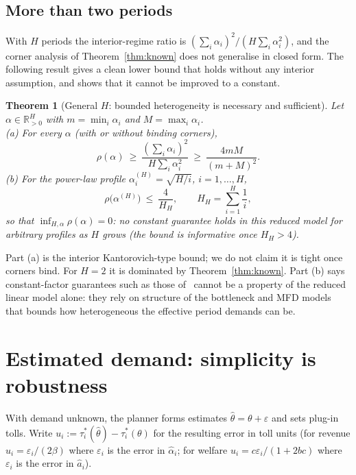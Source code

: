 \documentclass[11pt]{article}
\newtheorem{theorem}{Theorem}[section]
\theoremstyle{definition}
\theoremstyle{remark}
\newcommand{\R}{\mathbb{R}}
\begin{document}
\subsection{More than two periods}
With $H$ periods the interior-regime ratio is $(\sum_i\alpha_i)^2/(H\sum_i\alpha_i^2)$, and the corner analysis of Theorem~\ref{thm:known} does not generalise in closed form. The following result gives a clean lower bound that holds without any interior assumption, and shows that it cannot be improved to a constant.

\begin{theorem}[General $H$: bounded heterogeneity is necessary and sufficient]\label{thm:generalH}
Let $\alpha\in\R^H_{>0}$ with $m=\min_i\alpha_i$ and $M=\max_i\alpha_i$.\\
(a) For every $\alpha$ (with or without binding corners),
\[\rho(\alpha)\ \ge\ \frac{(\sum_i\alpha_i)^2}{H\sum_i\alpha_i^2}\ \ge\ \frac{4mM}{(m+M)^2}.\]
(b) For the power-law profile $\alpha^{(H)}_i=\sqrt{H/i}$, $i=1,\dots,H$,
\[\rho\big(\alpha^{(H)}\big)\ \le\ \frac{4}{H_H},\qquad H_H=\sum_{i=1}^H\frac1i,\]
so that $\inf_{H,\alpha}\rho(\alpha)=0$: no constant guarantee holds in this reduced model for arbitrary profiles as $H$ grows (the bound is informative once $H_H>4$).
\end{theorem}
Part (a) is the interior Kantorovich-type bound; we do not claim it is tight once corners bind. For $H=2$ it is dominated by Theorem~\ref{thm:known}. Part (b) says constant-factor guarantees such as those of~\cite{jde2026} cannot be a property of the reduced linear model alone: they rely on structure of the bottleneck and MFD models that bounds how heterogeneous the effective period demands can be.

\section{Estimated demand: simplicity is robustness}\label{sec:est}
With demand unknown, the planner forms estimates $\hat\theta=\theta+\varepsilon$ and sets plug-in tolls. Write $u_i:=\tau^*_i(\hat\theta)-\tau^*_i(\theta)$ for the resulting error in toll units (for revenue $u_i=\varepsilon_i/(2\beta)$ where $\varepsilon_i$ is the error in $\hat\alpha_i$; for welfare $u_i=c\varepsilon_i/(1+2bc)$ where $\varepsilon_i$ is the error in $\hat a_i$).
\end{document}
